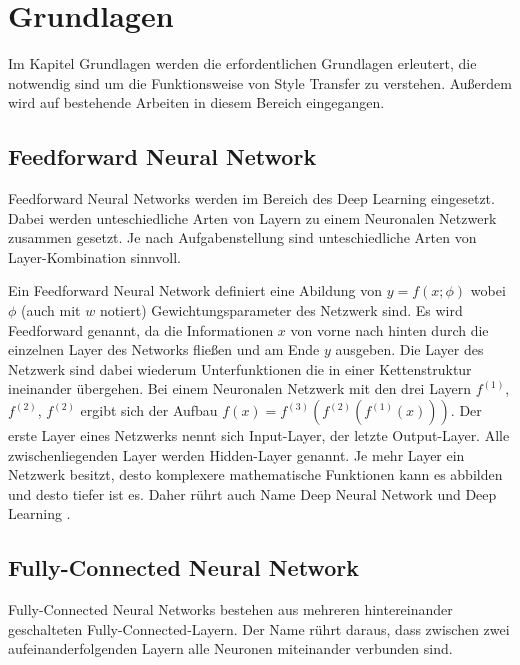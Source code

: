 \chapter{Grundlagen}
\label{cha:fundamentals}

Im Kapitel Grundlagen werden die erfordentlichen Grundlagen erleutert, die notwendig sind um die Funktionsweise von Style Transfer zu verstehen. Außerdem wird auf bestehende Arbeiten in diesem Bereich eingegangen.

\section{Feedforward Neural Network}

Feedforward Neural Networks werden im Bereich des Deep Learning eingesetzt. Dabei werden unteschiedliche Arten von Layern zu einem Neuronalen Netzwerk zusammen gesetzt. Je nach Aufgabenstellung sind unteschiedliche Arten von Layer-Kombination sinnvoll.

Ein Feedforward Neural Network definiert eine Abildung von $ y = f(x; \phi) $ wobei $ \phi $ (auch mit $ w $ notiert) Gewichtungsparameter des Netzwerk sind. Es wird Feedforward genannt, da die Informationen $ x $ von vorne nach hinten durch die einzelnen Layer des Networks fließen und am Ende $ y $ ausgeben. Die Layer des Netzwerk sind dabei wiederum Unterfunktionen die in einer Kettenstruktur ineinander übergehen. Bei einem Neuronalen Netzwerk mit den drei Layern $ f^{(1)} $, $ f^{(2)} $, $ f^{(2)} $ ergibt sich der Aufbau $ f(x) = f^{(3)}(f^{(2)}(f^{(1)}(x))) $. Der erste Layer eines Netzwerks nennt sich Input-Layer, der letzte Output-Layer. Alle zwischenliegenden Layer werden Hidden-Layer genannt. Je mehr Layer ein Netzwerk besitzt, desto komplexere mathematische Funktionen kann es abbilden und desto tiefer ist es. Daher rührt auch Name Deep Neural Network und Deep Learning \cite[164-165]{Goodfellow-et-al-2016}.

\pagebreak

\section{Fully-Connected Neural Network}

Fully-Connected Neural Networks bestehen aus mehreren hintereinander geschalteten Fully-Connected-Layern. Der Name rührt daraus, dass zwischen zwei aufeinanderfolgenden Layern alle Neuronen miteinander verbunden sind.

